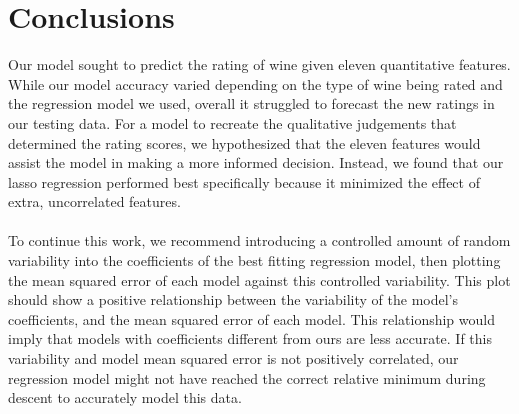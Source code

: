 
\section{Conclusions}
\label{sec:concl}

Our model sought to predict the rating of wine given eleven quantitative features. While our model accuracy varied depending on the type of wine being rated and the regression model we used, overall it struggled to forecast the new ratings in our testing data. For a model to recreate the qualitative judgements that determined the rating scores, we hypothesized that the eleven features would assist the model in making a more informed decision. Instead, we found that our  lasso regression performed best specifically because it minimized the effect of extra, uncorrelated features. \\\\
To continue this work, we recommend introducing a controlled amount of random variability into the coefficients of the best fitting regression model, then plotting the mean squared error of each model against this controlled variability. This plot should show a positive relationship between the variability of the model’s coefficients, and the mean squared error of each model. This relationship would imply that models with coefficients different from ours are less accurate. If this variability and model mean squared error is not positively correlated, our regression model might not have reached the correct relative minimum during descent to accurately model this data. 

